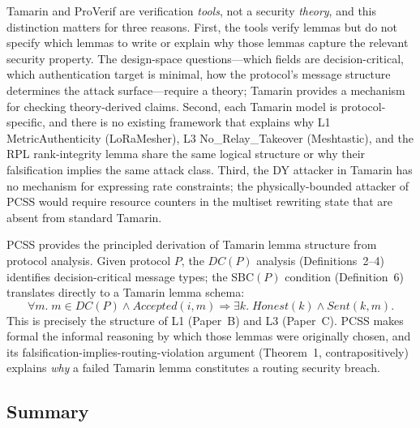 \documentclass[journal,compsoc]{IEEEtran}
\theoremstyle{plain}
\theoremstyle{definition}
\theoremstyle{remark}
\begin{document}
Tamarin and ProVerif are verification \emph{tools}, not a security
\emph{theory}, and this distinction matters for three reasons.  First, the
tools verify lemmas but do not specify which lemmas to write or explain why
those lemmas capture the relevant security property.  The design-space
questions---which fields are decision-critical, which authentication target
is minimal, how the protocol's message structure determines the attack
surface---require a theory; Tamarin provides a mechanism for checking
theory-derived claims.  Second, each Tamarin model is protocol-specific,
and there is no existing framework that explains why L1 MetricAuthenticity
(LoRaMesher), L3 No\_Relay\_Takeover (Meshtastic), and the RPL rank-integrity
lemma share the same logical structure or why their falsification implies the
same attack class.  Third, the DY attacker in Tamarin has no mechanism for
expressing rate constraints; the physically-bounded attacker of PCSS would
require resource counters in the multiset rewriting state that are absent
from standard Tamarin.

PCSS provides the principled derivation of Tamarin lemma structure from
protocol analysis.  Given protocol $P$, the $\mathit{DC}(P)$ analysis
(Definitions~2--4) identifies decision-critical message types; the SBC$(P)$
condition (Definition~6) translates directly to a Tamarin lemma schema:
\begin{equation*}
  \forall m.\; m \in \mathit{DC}(P) \wedge
  \mathit{Accepted}(i, m) \Rightarrow
  \exists k.\; \mathit{Honest}(k) \wedge \mathit{Sent}(k, m).
\end{equation*}
This is precisely the structure of L1 (Paper~B) and L3 (Paper~C).  PCSS
makes formal the informal reasoning by which those lemmas were originally
chosen, and its falsification-implies-routing-violation argument
(Theorem~1, contrapositively) explains \emph{why} a failed Tamarin lemma
constitutes a routing security breach.

\subsection*{Summary}
\end{document}
